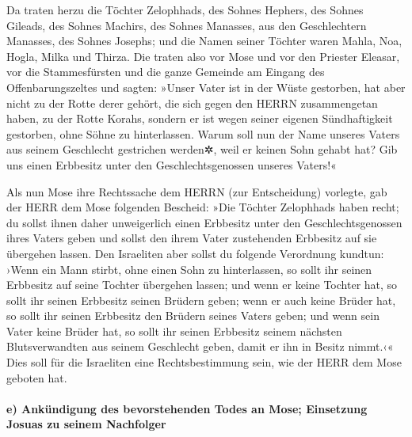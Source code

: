 Da traten herzu die Töchter Zelophhads, des Sohnes
Hephers, des Sohnes Gileads, des Sohnes Machirs, des Sohnes Manasses,
aus den Geschlechtern Manasses, des Sohnes Josephs; und die Namen seiner
Töchter waren Mahla, Noa, Hogla, Milka und Thirza. Die
traten also vor Mose und vor den Priester Eleasar, vor die
Stammesfürsten und die ganze Gemeinde am Eingang des Offenbarungszeltes
und sagten: »Unser Vater ist in der Wüste gestorben, hat
aber nicht zu der Rotte derer gehört, die sich gegen den HERRN
zusammengetan haben, zu der Rotte Korahs, sondern er ist wegen seiner
eigenen Sündhaftigkeit gestorben, ohne Söhne zu hinterlassen.
Warum soll nun der Name unseres Vaters aus seinem
Geschlecht gestrichen werden✲, weil er keinen Sohn gehabt hat? Gib uns
einen Erbbesitz unter den Geschlechtsgenossen unseres Vaters!«

Als nun Mose ihre Rechtssache dem HERRN (zur Entscheidung)
vorlegte, gab der HERR dem Mose folgenden Bescheid:
»Die Töchter Zelophhads haben recht; du sollst ihnen daher
unweigerlich einen Erbbesitz unter den Geschlechtsgenossen ihres Vaters
geben und sollst den ihrem Vater zustehenden Erbbesitz auf sie übergehen
lassen. Den Israeliten aber sollst du folgende Verordnung
kundtun: ›Wenn ein Mann stirbt, ohne einen Sohn zu hinterlassen, so
sollt ihr seinen Erbbesitz auf seine Tochter übergehen lassen;
und wenn er keine Tochter hat, so sollt ihr seinen
Erbbesitz seinen Brüdern geben; wenn er auch keine Brüder
hat, so sollt ihr seinen Erbbesitz den Brüdern seines Vaters geben;
und wenn sein Vater keine Brüder hat, so sollt ihr seinen
Erbbesitz seinem nächsten Blutsverwandten aus seinem Geschlecht geben,
damit er ihn in Besitz nimmt.‹« Dies soll für die Israeliten eine
Rechtsbestimmung sein, wie der HERR dem Mose geboten hat.

\hypertarget{e-ankuxfcndigung-des-bevorstehenden-todes-an-mose-einsetzung-josuas-zu-seinem-nachfolger}{%
\paragraph{e) Ankündigung des bevorstehenden Todes an Mose; Einsetzung
Josuas zu seinem
Nachfolger}\label{e-ankuxfcndigung-des-bevorstehenden-todes-an-mose-einsetzung-josuas-zu-seinem-nachfolger}}

